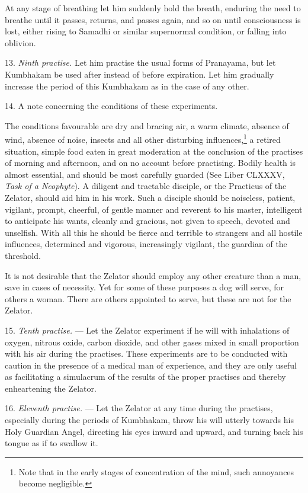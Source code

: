 At any stage of breathing let him suddenly hold the breath, enduring the need to breathe until it passes, returns, and passes again, and so on until consciousness is lost, either rising to Samadhi or similar supernormal condition, or falling into oblivion.

13. \textit{Ninth practise.} Let him practise the usual forms of Pranayama, but let Kumbhakam be used after instead of before expiration. Let him gradually increase the period of this Kumbhakam as in the case of any other.

14. A note concerning the conditions of these experiments.

The conditions favourable are dry and bracing air, a warm climate, absence of wind, absence of noise, insects and all other disturbing influences,\footnote{Note that in the early stages of concentration of the mind, such annoyances become negligible.} a retired situation, simple food eaten in great moderation at the conclusion of the practises of morning and afternoon, and on no account before practising. Bodily health is almost essential, and should be most carefully guarded (See Liber CLXXXV, \textit{Task of a Neophyte}). A diligent and tractable disciple, or the Practicus of the Zelator, should aid him in his work. Such a disciple should be noiseless, patient, vigilant, prompt, cheerful, of gentle manner and reverent to his master, intelligent to anticipate his wants, cleanly and gracious, not given to speech, devoted and unselfish. With all this he should be fierce and terrible to strangers and all hostile influences, determined and vigorous, increasingly vigilant, the guardian of the threshold.

It is not desirable that the Zelator should employ any other creature than a man, save in cases of necessity. Yet for some of these purposes a dog will serve, for others a woman. There are others appointed to serve, but these are not for the Zelator.

15. \textit{Tenth practise.} --- Let the Zelator experiment if he will with inhalations of oxygen, nitrous oxide, carbon dioxide, and other gases mixed in small proportion with his air during the practises. These experiments are to be conducted with caution in the presence of a medical man of experience, and they are only useful as facilitating a simulacrum of the results of the proper practises and thereby enheartening the Zelator.

16. \textit{Eleventh practise.} --- Let the Zelator at any time during the practises, especially during the periods of Kumbhakam, throw his will utterly towards his Holy Guardian Angel, directing his eyes inward and upward, and turning back his tongue as if to swallow it.

